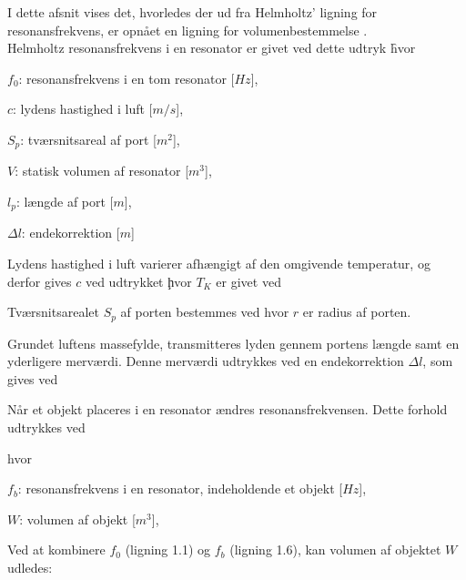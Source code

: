 I dette afsnit vises det, hvorledes der ud fra Helmholtz' ligning for resonansfrekvens, er opnået en ligning for volumenbestemmelse \citep{Refworks:22}. \\
 Helmholtz resonansfrekvens i en resonator er givet ved dette udtryk \f

hvor 
\begin{description}[align=left,labelindent=0.3cm]
\item $f_{0}$: resonansfrekvens i en tom resonator [$Hz$],\\
\item $c$: lydens hastighed i luft [$m/s$],\\
\item $S_{p}$: tværsnitsareal af port [$m^2$],\\
\item $V$: statisk volumen af resonator [$m^3$],\\
\item $l_{p}$: længde af port [$m$],\\
\item $\Delta l$: endekorrektion [$m$]\\
\end{description}

Lydens hastighed i luft varierer afhængigt af den omgivende temperatur, og derfor gives $c$ ved udtrykket \c 

hvor $T_{K}$ er givet ved \T

Tværsnitsarealet $S_{p}$ af porten bestemmes ved \Sp 
hvor ${r}$ er radius af porten. 

Grundet luftens massefylde, transmitteres lyden gennem portens længde samt en yderligere merværdi. Denne merværdi udtrykkes ved en endekorrektion $\Delta l$, som gives ved \deltal 

Når et objekt placeres i en resonator ændres resonansfrekvensen. Dette forhold udtrykkes ved \fb

hvor 
\begin{description}[align=left,labelindent=0.3cm]
\item $f_{b}$: resonansfrekvens i en resonator, indeholdende et objekt [$Hz$],\\
\item $W$: volumen af objekt [$m^3$],\\
\end{description}

Ved at kombinere $f_{0}$ (ligning 1.1) og $f_{b}$ (ligning 1.6), kan volumen af objektet $W$ udledes: 

